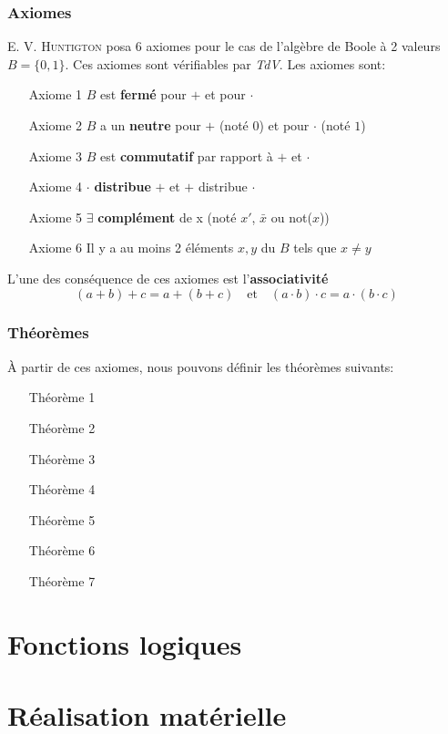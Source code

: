 \subsubsection{Axiomes}
E. V. \textsc{Huntigton} posa 6 axiomes pour le cas de l'algèbre de Boole à 2 valeurs $B=\{0,1\}$. Ces axiomes sont vérifiables par \textit{TdV}. Les axiomes sont:
\begin{itemize}
	\item[Axiome 1] $B$ est \textbf{fermé} pour $+$ et pour $\cdot$
	\item[Axiome 2] $B$ a un \textbf{neutre} pour $+$ (noté $0$) et pour $\cdot$ (noté $1$)
	\item[Axiome 3] $B$ est \textbf{commutatif} par rapport à $+$ et $\cdot$
	\item[Axiome 4] $\cdot$ \textbf{distribue} $+$ et $+$ distribue $\cdot$
	\item[Axiome 5] $\exists$ \textbf{complément} de x (noté $x'$, $\bar{x}$ ou not($x$))
	\item[Axiome 6] Il y a au moins 2 éléments $x,y$ du $B$ tels que $x\neq y$
\end{itemize}
L'une des conséquence de ces axiomes est l'\textbf{associativité}
\begin{equation}
	(a+b)+c=a+(b+c)\quad\text{et}\quad(a\cdot b)\cdot c=a\cdot(b\cdot c)
\end{equation}
\subsubsection{Théorèmes}
À partir de ces axiomes, nous pouvons définir les théorèmes suivants:
\begin{itemize}
	\item[Théorème 1]
	\item[Théorème 2]
	\item[Théorème 3]
	\item[Théorème 4]
	\item[Théorème 5]
	\item[Théorème 6]
	\item[Théorème 7]
\end{itemize}
\section{Fonctions logiques}

\section{Réalisation matérielle}
